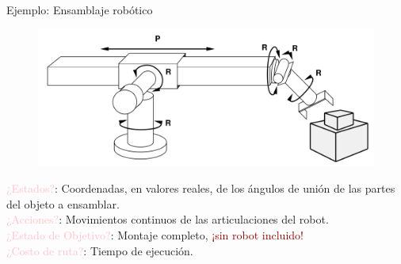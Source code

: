 
\begin{frame}{Ejemplo: Ensamblaje robótico}
\begin{figure}
    \centering
    \includegraphics[scale=0.23]{24_chap3_pag24.png}
\end{figure}
\begin{flushleft}
    \textcolor{Pink}{¿Estados?}: Coordenadas, en valores reales, de los ángulos de unión de las partes del objeto a ensamblar.\\
    \textcolor{Pink}{¿Acciones?}: Movimientos continuos de las articulaciones del
    robot.\\
    \textcolor{Pink}{¿Estado de Objetivo?}: Montaje completo,
    \textcolor{DarkRed}{¡sin robot incluido!}\\
    \textcolor{Pink}{¿Costo de ruta?}: Tiempo de ejecución.
\end{flushleft}
\end{frame}
